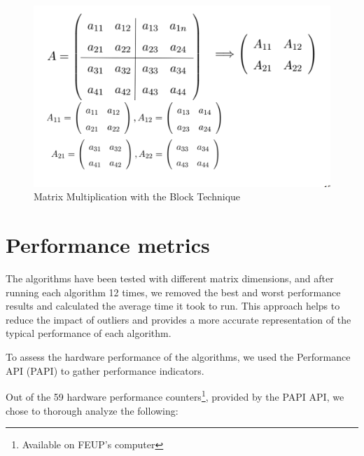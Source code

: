 \documentclass[10pt, titlepage]{extarticle}
\begin{document}
\begin{figure}[H]
    \centering
    \includegraphics[width=0.4\linewidth]{../misc/block-matrix.png}
    \caption{Matrix Multiplication with the Block Technique}
\end{figure}



\section{Performance metrics}\label{Performance metrics}

The algorithms have been tested with different matrix dimensions, and after running each algorithm 12 times,
we removed the best and worst performance results and calculated the average time it took to run.
This approach helps to reduce the impact of outliers and provides a more accurate representation of
the typical performance of each algorithm.

To assess the hardware performance of the algorithms, we used the Performance API (PAPI) to gather performance indicators.

Out of the 59 hardware performance counters\footnote{Available on FEUP's computer}, provided by the PAPI API, we chose to thorough analyze the following:
\end{document}
